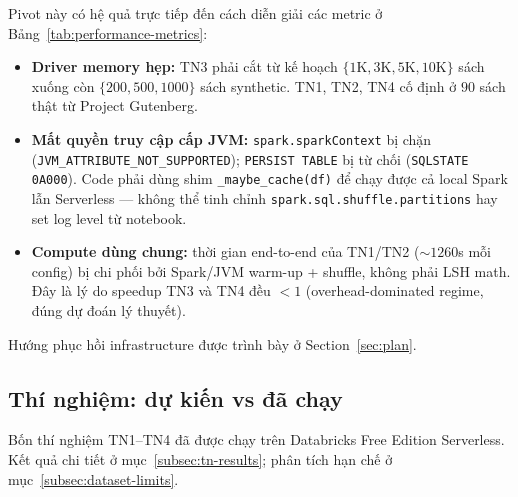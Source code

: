 Pivot này có hệ quả trực tiếp đến cách diễn giải các metric ở Bảng~\ref{tab:performance-metrics}:
\begin{itemize}
    \item \textbf{Driver memory hẹp:} TN3 phải cắt từ kế hoạch $\{1\text{K}, 3\text{K}, 5\text{K}, 10\text{K}\}$ sách xuống còn $\{200, 500, 1000\}$ sách synthetic. TN1, TN2, TN4 cố định ở $90$ sách thật từ Project Gutenberg.
    \item \textbf{Mất quyền truy cập cấp JVM:} \texttt{spark.sparkContext} bị chặn (\texttt{JVM\_ATTRIBUTE\_NOT\_SUPPORTED}); \texttt{PERSIST TABLE} bị từ chối (\texttt{SQLSTATE 0A000}). Code phải dùng shim \texttt{\_maybe\_cache(df)} để chạy được cả local Spark lẫn Serverless --- không thể tinh chỉnh \texttt{spark.sql.shuffle.partitions} hay set log level từ notebook.
    \item \textbf{Compute dùng chung:} thời gian end-to-end của TN1/TN2 ($\sim 1260$s mỗi config) bị chi phối bởi Spark/JVM warm-up + shuffle, không phải LSH math. Đây là lý do speedup TN3 và TN4 đều $< 1$ (overhead-dominated regime, đúng dự đoán lý thuyết).
\end{itemize}

Hướng phục hồi infrastructure được trình bày ở Section~\ref{sec:plan}.

\subsection{Thí nghiệm: dự kiến vs đã chạy}

Bốn thí nghiệm TN1--TN4 đã được chạy trên Databricks Free Edition Serverless. Kết quả chi tiết ở mục~\ref{subsec:tn-results}; phân tích hạn chế ở mục~\ref{subsec:dataset-limits}.

